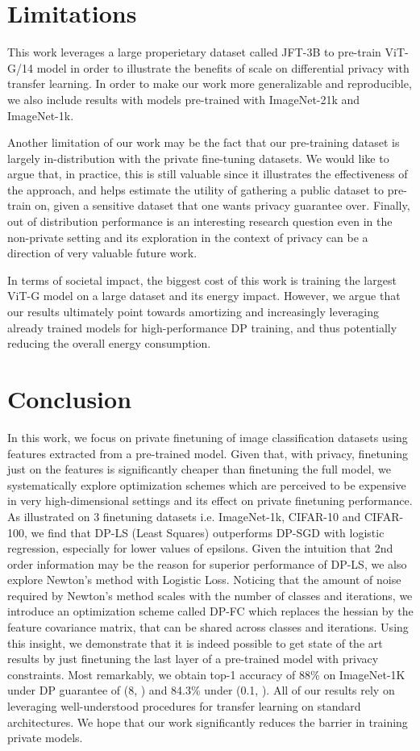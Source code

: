 \documentclass[letterpaper]{article} \usepackage{fullpage}
\begin{document}
 
\section{Limitations}
This work leverages a large properietary dataset called JFT-3B to pre-train ViT-G/14 model in order to illustrate the benefits of scale on differential privacy with transfer learning. In order to make our work more generalizable and reproducible, we also include results with models pre-trained with ImageNet-21k and ImageNet-1k. 

Another limitation of our work may be the fact that our pre-training dataset is largely in-distribution with the private fine-tuning datasets. We would like to argue that, in practice, this is still valuable since it illustrates the effectiveness of the approach, and helps estimate the utility of gathering a public dataset to pre-train on, given a sensitive dataset that one wants privacy guarantee over. Finally, out of distribution performance is an interesting research question even in the non-private setting and its exploration in the context of privacy can be a direction of very valuable future work. 


In terms of societal impact, the biggest cost of this work is training the largest ViT-G model on a large dataset and its energy impact. However, we argue that our results ultimately point towards amortizing and increasingly leveraging already trained models for high-performance DP training, and thus potentially reducing the overall energy consumption.

\section{Conclusion}
In this work, we focus on private finetuning of image classification datasets using features extracted from a pre-trained model. Given that, with privacy, finetuning just on the features is significantly cheaper than finetuning the full model, we systematically explore optimization schemes which are perceived to be expensive in very high-dimensional settings and its effect on private finetuning performance. As illustrated on 3 finetuning datasets i.e. ImageNet-1k, CIFAR-10 and CIFAR-100, we find that DP-LS (Least Squares) outperforms DP-SGD with logistic regression, especially for lower values of epsilons. Given the intuition that 2nd order information may be the reason for superior performance of DP-LS, we also explore Newton's method with Logistic Loss. Noticing that the amount of noise required by Newton's method scales with the number of classes and iterations, we introduce an optimization scheme called DP-FC which replaces the hessian by the feature covariance matrix, that can be shared across classes and iterations. Using this insight, we demonstrate that it is indeed possible to get state of the art results by just finetuning the last layer of a pre-trained model with privacy constraints. Most remarkably, we obtain top-1 accuracy of 88\% on ImageNet-1K under DP guarantee of (8, ) and 84.3\% under (0.1, ). All of our results rely on leveraging well-understood procedures for transfer learning on standard architectures. We hope that our work significantly reduces the barrier in training private models.
\end{document}
